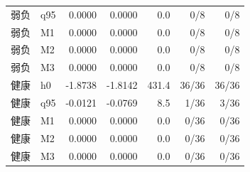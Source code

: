 \begin{tabular}{llrrrrr}
弱负 & q95 & 0.0000 & 0.0000 & 0.0 & 0/8 & 0/8 \\
弱负 & M1 & 0.0000 & 0.0000 & 0.0 & 0/8 & 0/8 \\
弱负 & M2 & 0.0000 & 0.0000 & 0.0 & 0/8 & 0/8 \\
弱负 & M3 & 0.0000 & 0.0000 & 0.0 & 0/8 & 0/8 \\
健康 & h0 & -1.8738 & -1.8142 & 431.4 & 36/36 & 36/36 \\
健康 & q95 & -0.0121 & -0.0769 & 8.5 & 1/36 & 3/36 \\
健康 & M1 & 0.0000 & 0.0000 & 0.0 & 0/36 & 0/36 \\
健康 & M2 & 0.0000 & 0.0000 & 0.0 & 0/36 & 0/36 \\
健康 & M3 & 0.0000 & 0.0000 & 0.0 & 0/36 & 0/36 \\
\bottomrule
\end{tabular}
